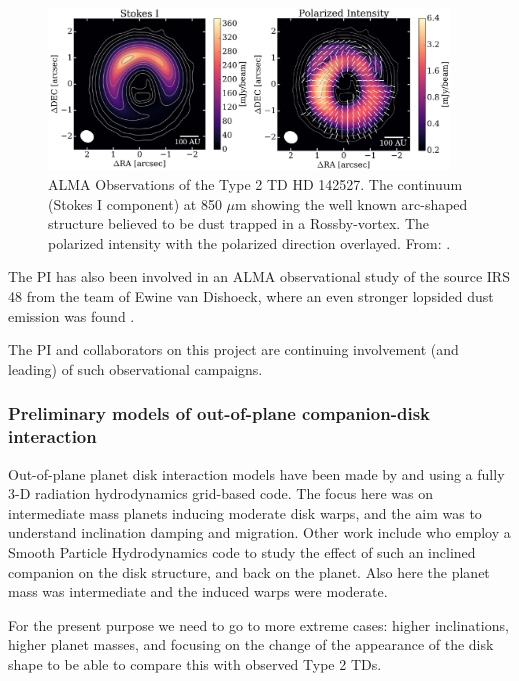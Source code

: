 \documentclass[10pt,fleqn,twoside]{article}
\begin{document}
\begin{figure}
\centerline{\includegraphics[width=0.95\textwidth]{D2Fig/Kataoka-eps-converted-to.pdf}}
\caption{\label{fig-kataoka} ALMA Observations of the Type 2 TD HD 142527.
   The continuum (Stokes I component) at 850 $\mu$m
  showing the well known arc-shaped structure believed to be dust trapped in
  a Rossby-vortex.   The polarized intensity with the
  polarized direction overlayed.  From: \citet{2016ApJ...831L..12K}.}
\end{figure}

The PI has also been involved in an ALMA observational study of the source
IRS 48 from the team of Ewine van Dishoeck, where an even stronger lopsided
dust emission was found \citep{2013Sci...340.1199V}. 

The PI and collaborators on this project are continuing involvement (and
leading) of such observational campaigns.


\subsubsection{Preliminary models of out-of-plane companion-disk interaction}
Out-of-plane planet disk interaction models have been made by
\citet{2011A&A...530A..41B} and \citet{2013A&A...555A.124B} using a fully
3-D radiation hydrodynamics grid-based code. 
The focus here was on intermediate mass planets inducing moderate
disk warps, and the aim was to understand inclination damping and
migration. Other work include \citet{2013MNRAS.431.1320X} who employ
a Smooth Particle Hydrodynamics code to study the effect of such an
inclined companion on the disk structure, and back on the planet. Also
here the planet mass was intermediate and the induced warps were moderate.
 
For the present purpose we need to go to more extreme cases: higher
inclinations, higher planet masses, and focusing on the change of the
appearance of the disk shape to be able to compare this with observed Type 2
TDs.
\end{document}
